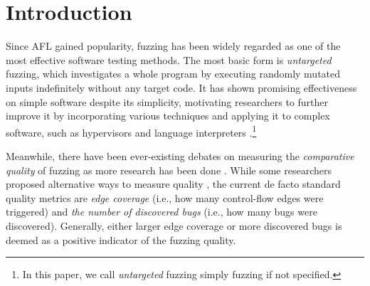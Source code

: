 \documentclass[letterpaper,twocolumn,10pt]{article}
\begin{document}
\section{Introduction}
%

Since AFL \cite{afl} gained popularity, fuzzing has been widely regarded as
one of the most effective software testing methods.
%
The most basic form is \emph{untargeted} fuzzing, which investigates a whole
program by executing randomly mutated inputs indefinitely without any target
code.
%
It has shown promising effectiveness on simple software despite its simplicity,  
motivating researchers to further improve it by incorporating various
techniques
\cite{liu2023dsfuzz,deng2023nestfuzz,zheng2023fishfuzz,wu2022strategy,aschermann2019redqueen,rawat2017vuzzer,fioraldi2020aflpp}
and applying it to complex software, such as hypervisors
\cite{liu2023videzzo,myung2022mundofuzz,sergej2021nyx,schumilo2020hypercube} and
language interpreters
\cite{wang2023fuzzjit,wu2023jitfuzz,gross2023fuzzilli,srivastava2021gramatron,chen2021polyglot}.\footnote{In
this paper, we call  \emph{untargeted} fuzzing simply fuzzing if not specified.}

Meanwhile, there have been ever-existing debates on measuring the
\emph{comparative quality} of fuzzing as more research has been done
\cite{wang2020notallcov,wang2019impactcov,bohme2022reliability,klees2018eval,li2021unifuzz}.
While some researchers proposed alternative ways to measure quality
\cite{bohme2021residual,bohme2022reliability,li2021unifuzz}, the
current de facto standard quality metrics are \emph{edge coverage} (i.e., how
many control-flow edges were triggered) and \emph{the number of discovered bugs}
(i.e., how many bugs were discovered). Generally, either larger edge coverage or
more discovered bugs is deemed as a positive indicator of the fuzzing quality.
\end{document}
